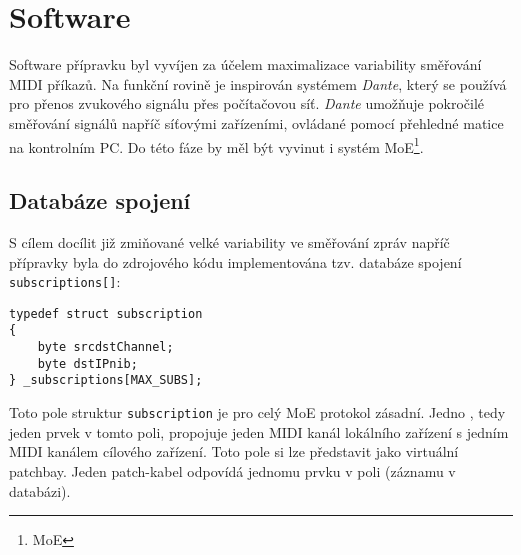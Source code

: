 \section{Software}
Software přípravku byl vyvíjen za účelem maximalizace variability směřování \acs{MIDI} příkazů. Na funkční rovině je inspirován systémem \emph{Dante}, který se používá pro přenos zvukového signálu přes počítačovou síť. \emph{Dante} umožňuje pokročilé směřování signálů napříč síťovými zařízeními, ovládané pomocí přehledné matice na kontrolním PC. Do této fáze by měl být vyvinut i systém \acs{MoE}\footnote{\acl{MoE}}.
\subsection{Databáze spojení}\label{chpt:DatSpoj}
S cílem docílit již zmiňované velké variability ve směřování zpráv napříč přípravky byla do zdrojového kódu implementována tzv. databáze spojení \texttt{sub\-scrip\-tions[]}:
\begin{lstlisting}
typedef struct subscription
{
    byte srcdstChannel;
    byte dstIPnib;
} _subscriptions[MAX_SUBS];
\end{lstlisting}
Toto pole struktur \texttt{subscription} je pro celý \acs{MoE} protokol zásadní. Jedno , tedy jeden prvek v tomto poli, propojuje jeden \acs{MIDI} kanál lokálního zařízení s jedním \acs{MIDI} kanálem cílového zařízení. Toto pole si lze představit jako virtuální patchbay. Jeden patch-kabel odpovídá jednomu prvku v poli (záznamu v databázi). 

